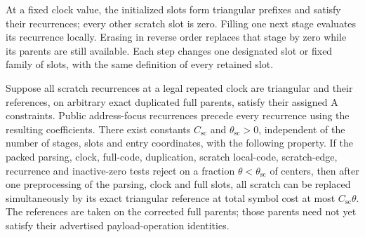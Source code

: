 At a fixed clock value, the initialized slots form triangular prefixes
and satisfy their recurrences; every other scratch slot is zero.
Filling one next stage evaluates its recurrence locally.  Erasing in
reverse order replaces that stage by zero while its parents are still
available.  Each step changes one designated slot or fixed family of
slots, with the same definition of every retained slot.

\begin{lemma}\label{op:scratch-restoration}
Suppose all scratch recurrences at a legal repeated clock are
triangular and their references, on arbitrary exact duplicated full
parents, satisfy their assigned A constraints.  Public address-focus
recurrences precede every recurrence using the resulting coefficients.
There exist constants $C_{\mathrm{sc}}$ and $\theta_{\mathrm{sc}}>0$,
independent of the number of stages, slots and entry coordinates,
with the following property.  If the packed parsing, clock, full-code,
duplication, scratch local-code, scratch-edge, recurrence and inactive-zero
tests reject on a fraction $\theta<\theta_{\mathrm{sc}}$ of centers,
then after one preprocessing of the parsing, clock and full slots,
all scratch can be replaced simultaneously by its exact triangular
reference at total symbol cost at most $C_{\mathrm{sc}}\theta$.
The references are taken on the corrected full parents; those parents
need not yet satisfy their advertised payload-operation identities.
\end{lemma}

